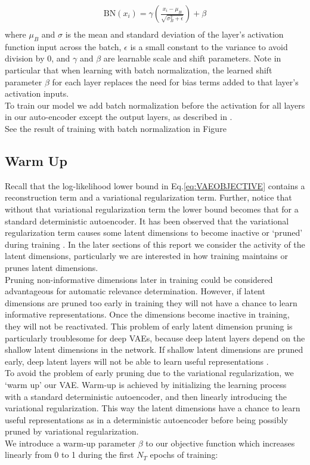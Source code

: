 \documentclass{article} %
\begin{document}
\begin{align*}
    \text{BN}(x_i)=\gamma(\frac{x_i-\mu_B}{\sqrt{\sigma_B^2+\epsilon}})+\beta\\
\end{align*} 
where $\mu_B$ and $\sigma$ is the mean and standard deviation of the layer's activation function input across the batch, $\epsilon$ is a small constant to the variance to avoid division by 0, and $\gamma$ and $\beta$ are learnable scale and shift parameters. Note in particular that when learning with batch normalization, the learned shift parameter $\beta$ for each layer replaces the need for bias terms added to that layer's activation inputs. \\
To train our model we add batch normalization before the activation for all layers in our auto-encoder except the output layers, as described in \cite{Sonderby2016}. \\
See the result of training with batch normalization in Figure %

\subsection{Warm Up}
%
Recall that the log-likelihood lower bound in Eq.\ref{eq:VAEOBJECTIVE} contains a reconstruction term and a variational regularization term. Further, notice that without that variational regularization term the lower bound becomes that for a standard deterministic autoencoder. It has been observed that the variational regularization term causes some latent dimensions to become inactive or `pruned' during training \cite{MacKay2001, Burda2016}. In the later sections of this report we consider the activity of the latent dimensions, particularly we are interested in how training maintains or prunes latent dimensions. \\
Pruning non-informative dimensions later in training could be considered advantageous for automatic relevance determination. However, if latent dimensions are pruned too early in training they will not have a chance to learn informative representations. Once the dimensions become inactive in training, they will not be reactivated. This problem of early latent dimension pruning is particularly troublesome for deep VAEs, because deep latent layers depend on the shallow latent dimensions in the network. If shallow latent dimensions are pruned early,  deep latent layers will not be able to learn useful representations \cite{Sonderby2016}.\\
To avoid the problem of early pruning due to the variational regularization, we `warm up' our VAE. Warm-up is achieved by initializing the learning process with a standard deterministic autoencoder, and then linearly introducing the variational regularization. This way the latent dimensions have a chance to learn useful representations as in a deterministic autoencoder before being possibly pruned by variational regularization.\\
We introduce a warm-up parameter $\beta$ to our objective function which increases linearly from 0 to 1 during the first $N_T$ epochs of training:
\end{document}
